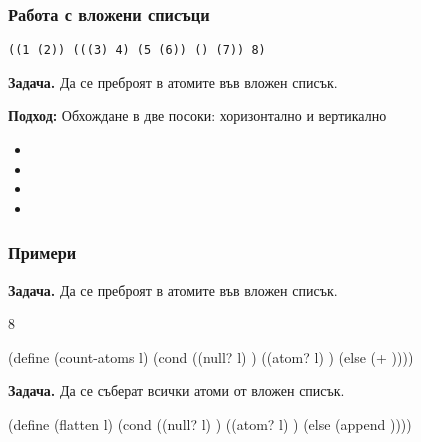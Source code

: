 \documentclass{beamer}
\begin{document}
\begin{frame}[fragile]
  \frametitle{Работа с вложени списъци}

\begin{verbatim}
((1 (2)) (((3) 4) (5 (6)) () (7)) 8)
\end{verbatim}

  \textbf{Задача.} Да се преброят в атомите във вложен списък.

  \pause

  \textbf{Подход:} Обхождане в две посоки: хоризонтално и вертикално
  \begin{itemize}[<+->]
  \item {} 
  \item {} 
  \item {} 
  \item {} 
  \end{itemize}
  \vspace{1em}

\end{frame}

\begin{frame}[fragile]
  \frametitle{Примери}
  \small

  \textbf{Задача.} Да се преброят в атомите във вложен списък.

  8

  \pause

\begin{semiverbatim}
(define (count-atoms l)
  (cond ((null? l) )
        ((atom? l) )
        (else (+  ))))
\end{semiverbatim}
  \vspace{1em}

  \pause

  \textbf{Задача.} Да се съберат всички атоми от вложен списък.


  \pause

\begin{semiverbatim}
(define (flatten l)
  (cond ((null? l) )
        ((atom? l) )
        (else (append  ))))
\end{semiverbatim}

\end{frame}
\end{document}
